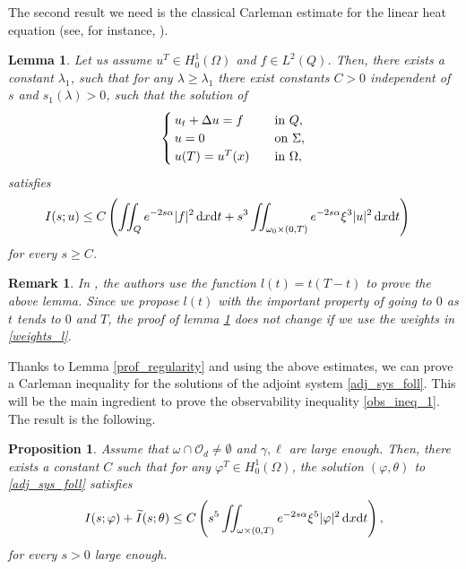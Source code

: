 \documentclass[preprint,10pt]{article}
\newtheorem{lemma}[theorem]{Lemma}
\newtheorem{proposition}[theorem]{Proposition}
\newtheorem{remark}[theorem]{Remark}
\numberwithin{equation}{section}
\numberwithin{theorem}{section}
\def\dx{\,\textnormal{d}x}
\def\dt{\textnormal{d}t}
\def\dx{\,\textnormal{d}x}
\def\dt{\textnormal{d}t}
\begin{document}
{The second result we need is the classical Carleman estimate for the linear heat equation (see, for instance, \cite{fursi,cara_guerrero}).
\begin{lemma}\label{2once}
Let us assume $u^T\in H_0^1(\Omega)$ and $f\in L^2(Q)$. Then, there exists a constant $\lambda_1$, such that for any $\lambda\geq \lambda_1$ there exist constants $C>0$ independent of $s$ and $s_1(\lambda)>0$, such that the solution of 
%
\begin{equation}\label{sys_u}
\begin{cases}
u_t+\Delta u=f \quad& \textnormal{in } Q, \\
u=0 \quad& \textnormal{on } \Sigma, \\
u(T)=u^T(x) \quad& \textnormal{in } \Omega,
\end{cases}
\end{equation}
%
satisfies
%
\begin{equation}\label{car_clasica}
\begin{split}
I(s;u)\leq C&\left(\iint_Qe^{-2s\alpha}|f|^2\dx\dt+s^3\iint_{\omega_0\times(0,T)}e^{-2s\alpha}\xi^3|u|^2\dx\dt\right)
\end{split}
\end{equation}
%
for every $s\geq C$. 
\end{lemma}
%
\begin{remark}
In \cite{fursi,cara_guerrero}, the authors use the function $l(t)=t(T-t)$ to prove the above lemma. Since we propose $l(t)$ with the important property of going to $0$ as $t$ tends to $0$ and $T$, the proof of lemma \ref{2once} does not change if we use the weights in \eqref{weights_l}.
\end{remark}

Thanks to Lemma \ref{prof_regularity} and using the above estimates, we can prove a Carleman inequality for the solutions of the adjoint system \eqref{adj_sys_foll}. This will be the main ingredient to prove the observability inequality \eqref{obs_ineq_1}. The result is the following.
%
\begin{proposition}\label{prop_carleman}
Assume that $\omega\cap\mathcal O_d\neq \emptyset$ and $\gamma,\ell$ are large enough. Then, there exists a constant $C$ such that for any $\varphi^T\in H^1_0(\Omega)$, the solution $(\varphi,\theta)$ to \eqref{adj_sys_foll} satisfies
%
\begin{equation}\label{car_final}
\begin{split}
I(s;\varphi)+\widetilde I(s;\theta) \leq C\left(s^5\iint_{\omega\times(0,T)}e^{-2s\alpha}\xi^5|\varphi|^2\dx\dt\right),
\end{split}
\end{equation}
%
for every $s>0$ large enough.
%
\end{proposition}

}
\end{document}
